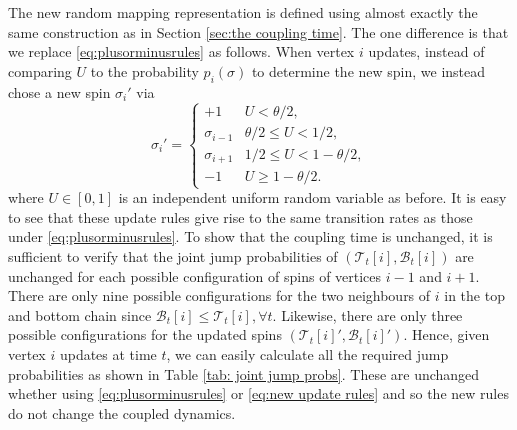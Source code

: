 	The new random mapping representation is defined using almost exactly the same construction as in Section \ref{sec:the coupling time}. The one difference is that we replace \eqref{eq:plusorminusrules} as follows. When vertex $i$ updates, instead of comparing $U$ to the probability $p_i(\sigma)$ to determine the new spin, we instead chose a new spin $\sigma_i'$ via
	\begin{equation}
	\label{eq:new update rules}
		\sigma_i' = \begin{cases}
			+1 & U < \theta/2,\\
			\sigma_{i-1} & \theta/2 \leq U < 1/2,\\
			\sigma_{i+1} & 1/2 \leq U < 1 - \theta/2,\\
			-1 & U \geq 1 - \theta/2.
		\end{cases}
	\end{equation}
	where $U \in [0,1]$ is an independent uniform random variable as before. It is easy to see that these update rules give rise to the same transition rates as those under \eqref{eq:plusorminusrules}. 
	To show that the coupling time is unchanged, it is sufficient to verify that the joint jump probabilities of $(\mathscr{T}_t[i], \mathscr{B}_t[i])$ are unchanged for each possible configuration of spins of vertices $i-1$ and $i+1$. There are only nine possible configurations for the two neighbours of $i$ in the top and bottom chain since $\mathscr{B}_t[i] \leq \mathscr{T}_t[i], \forall t$. Likewise, there are only three possible configurations for the updated spins $(\mathscr{T}_t[i]', \mathscr{B}_t[i]')$. Hence, given vertex $i$ updates at time $t$, we can easily calculate all the required jump probabilities as shown in Table \ref{tab: joint jump probs}. These are unchanged whether using \eqref{eq:plusorminusrules} or \eqref{eq:new update rules} and so the new rules do not change the coupled dynamics.


